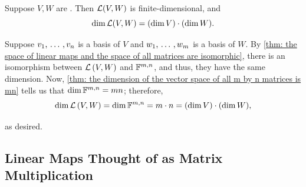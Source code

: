   \begin{thm} [$\dim \lvw = (\dim V)\cdot(\dim W)$]
    \label{thm: dimension of L(V,W) = dim L (V) * dim W (W)}
    Suppose $V,W$ are \fd. Then ${\mathcal{L}(V,W)}$ is finite-dimensional, and
    \begin{equation}
      \dim {\mathcal{L}(V,W)} = (\dim V)\cdot(\dim W).
    \end{equation}
  \end{thm}
  \begin{prf}

    Suppose $v_1, {\, \ldots \,\,}, v_n$ is a basis of $V$ and $w_1, {\, \ldots \,\,}, w_m$ is a basis of $W$.
    By \ref{thm: the space of linear maps and the space of all matrices are isomorphic}, there is an isomorphism between ${\mathcal{L}\left (V, W\right )}$ and $\mathbb{F}^{m,n}$, and thus, they have the same dimension. Now, \ref{thm: the dimension of the vector space of all m by n matrices is mn} tells us that $\dim \mathbb{F}^{m,n} = mn$; therefore,
    \begin{equation}
      \dim {\mathcal{L}\left (V, W\right )} = \dim \mathbb{F}^{m,n} = m\cdot n = (\dim V)\cdot(\dim W),
    \end{equation}

    as desired.
  \end{prf}

  \subsection{Linear Maps Thought of as Matrix Multiplication}

